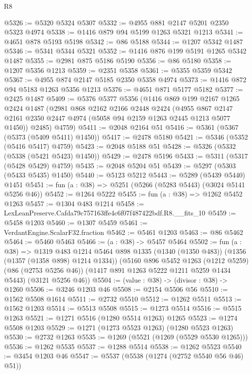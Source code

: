 \begin{lexlean}{R8}
\begin{coremodule}
@5326 := @5320 @5324 @5307
@5332 := @4955 @881 @2147 @5201 @2350 @5323 @4974
@5338 := @1416 @879 @94 @5199 @1263 @5321 @1213
@5341 := @4651 @878 @5193 @5198
@5342 := @86 @5188
@5344 := @1207 @5342 @1487
@5346 := @5341 @5344 @5321
@5352 := @1416 @876 @199 @5191 @1265 @5342 @1487
@5355 := @2981 @875 @5186 @5190
@5356 := @86 @5180
@5358 := @1207 @5356 @1213
@5359 := @2351 @5358
@5361 := @5355 @5359 @5342
@5367 := @4955 @874 @2147 @5185 @2350 @5358 @4974
@5373 := @1416 @872 @94 @5183 @1263 @5356 @1213
@5376 := @4651 @871 @5177 @5182
@5377 := @2425 @1487
@5409 := @5376
    @5377
    @5356
    (@1416
      @869
      @199
      @2167
      @1265
      @2424
      @1487
      (@2981
        @868
        @2162
        @2166
        @2448
        @2424
        (@4955 @867 @2147 @2161 @2350 @2447 @4974 (@5058 @94 @2159 @1263 @2445 @1213 @5077 @1450))
        @2485)
      @4759)
@5411 := @2048 @2164 @51
@5416 := @5361 (@5367 (@5373 (@5409 @5411) @1450))
@5417 := @2478 @5180
@5421 := @5346 (@5352 (@5416 @5417) @4759)
@5423 := @2048 @5188 @51
@5428 := @5326 (@5332 (@5338 (@5421 @5423) @1450))
@5429 := @2478 @5196
@5433 := @5311 (@5317 (@5428 @5429) @4759)
@5435 := @2048 @5204 @51
@5439 := @5297 (@5303 (@5433 @5435) @1450)
@5440 := @5123 @5212
@5443 := @5289 (@5439 @5440) @1451
@5451 := fun (a : @38) => @5251 (@5266 (@5283 @5443) (@3024 @5141 @5256 @46))
@5452 := @1264 @5222
@5455 := fun (a : @38) => @1262 @5452 @1263
@5457 := @1304 @483 @1214
@5458 := LexLeanPreserve.Cafda79c757163ffe4c6f07f487422bdf.R8.__fits_10
@5459 := @5458 @1203
@5460 := @1307 @5459
@5461 := VerdantEngine.ScalarF32.fraction
@5462 := @5461 @1203
@5463 := @86 @5462
@5464 := @5460 @5463
@5466 := (a : @38) -> @5457 @5464
@5502 := fun (a : @38) =>
  @1319
    @483
    @1214
    @5464
    @898
    @1335
    (@1340 (@1350 @483))
    (@1356 (@1357 (@1358 @898) @1214 @1334))
    (@5160
      @896
      @5452
      @1263
      (@1212 @5259)
      (@86 (@2753 @5256 @46))
      (@1417 @891 @1263 @5222 @1211 @5259 @1434 @5443)
      (@3121 @5256 @46))
@5504 := (value : @38) -> (divisor : @38) -> @1260
@5506 := @3246 @1203 @46
@5508 := @2154 @5506 @56
@5510 := @1562 @5508 @1614
@5511 := @2732 @5510
@5512 := @1262 @5511
@5513 := @1562 @1203
@5514 := @5513 @5508
@5515 := @1273 @5514
@5516 := @5515 @1263
@5521 := @1271 @5516 (@1280 @5514 @1263) @1265
@5523 := @1274 @5508 @1203
@5529 := @1271 (@1273 @5523 @1263) (@1280 @5523 @1263)
@5530 := @2732 @1263
@5535 := @1269 (@5521 (@1269 (@5529 @5530 @1265)))
@5536 := @1262 @5535
@5537 := @1288 @5514
@5538 := @1262 @5523
@5540 := @3454 @1203 @46
@5547 := @5537 (@5538 (@1274 (@2752 @5540 @56 @46) @51))

\end{coremodule}
\end{lexlean}
